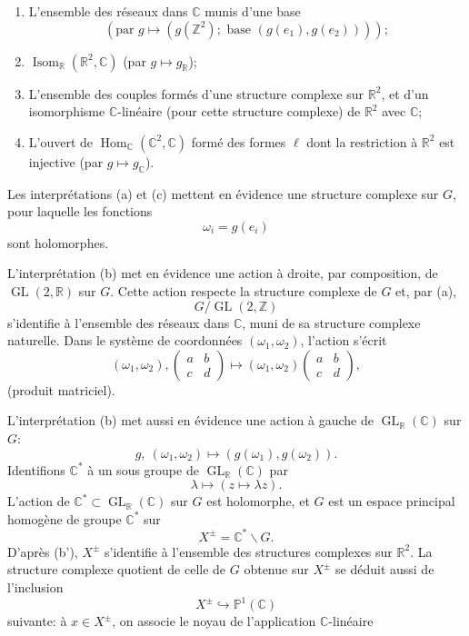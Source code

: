 \documentclass[10pt,a4paper]{article}
\providecommand{\GL}{\operatorname{GL}}
\providecommand{\Hom}{\operatorname{Hom}}
\providecommand{\Isom}{\operatorname{Isom}}
\providecommand{\R}{\mathbb R}
\providecommand{\Z}{\mathbb Z}
\providecommand{\C}{\mathbb C}
\begin{document}
\clearpage
{}
\hypertarget{authority-9}{}
\begin{enumerate}[label=(\alph*)]
\item L'ensemble des réseaux dans $\C$ munis d'une base
\[
(\text{par }g\longmapsto (g(\Z^2);\text{ base }(g(e_1),g(e_2))));
\]
\item $\Isom_{\R}(\R^2,\C)$ (par $g\mapsto g_{\R}$);
\item[(b')] L'ensemble des couples formés d'une structure complexe sur $\R^2$, et d'un isomorphisme $\C$-linéaire (pour cette structure complexe) de $\R^2$ avec $\C$;
\item[(c)] L'ouvert de $\Hom_{\C}(\C^2,\C)$ formé des formes $\ell$ dont la restriction à $\R^2$ est injective (par $g\mapsto g_{\C}$).
\end{enumerate}

Les interprétations (a) et (c) mettent en évidence une structure complexe sur $G$, pour laquelle les fonctions
\[
\omega_i=g(e_i)
\]
sont holomorphes.

L'interprétation (b) met en évidence une action à droite, par composition, de $\GL(2,\R)$ sur $G$. Cette action respecte la structure complexe de $G$ et, par (a),
\[
G/\GL(2,\Z)
\]
s'identifie à l'ensemble des réseaux dans $\C$, muni de sa structure complexe naturelle. Dans le système de coordonnées $(\omega_1,\omega_2)$, l'action s'écrit
\[
(\omega_1,\omega_2),
\begin{pmatrix}a&b\\ c&d\end{pmatrix}
\longmapsto
(\omega_1,\omega_2)\begin{pmatrix}a&b\\ c&d\end{pmatrix},
\]
(produit matriciel).

L'interprétation (b) met aussi en évidence une action à gauche de $\GL_{\R}(\C)$ sur $G$:
\[
g,\ (\omega_1,\omega_2)\longmapsto(g(\omega_1),g(\omega_2)).
\]
Identifions $\C^*$ à un sous groupe de $\GL_{\R}(\C)$ par
\[
\lambda\longmapsto(z\longmapsto\lambda z).
\]
L'action de $\C^*\subset\GL_{\R}(\C)$ sur $G$ est holomorphe, et $G$ est un espace principal homogène de groupe $\C^*$ sur
\[
X^\pm=\C^*\backslash G.
\]
D'après (b'), $X^\pm$ s'identifie à l'ensemble des structures complexes sur $\R^2$. La structure complexe quotient de celle de $G$ obtenue sur $X^\pm$ se déduit aussi de l'inclusion
\[
X^\pm\hookrightarrow\mathbb P^1(\C)
\]
suivante: à $x\in X^\pm$, on associe le noyau de l'application $\C$-linéaire
\end{document}
